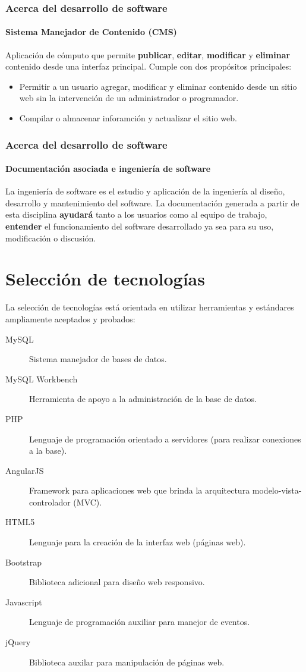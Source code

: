 \documentclass{beamer}
\begin{document}
\begin{frame}
	\frametitle{Acerca del desarrollo de software}
	\framesubtitle{Sistema Manejador de Contenido (CMS)}
	Aplicación de cómputo que permite \textbf{publicar}, \textbf{editar}, \textbf{modificar} y \textbf{eliminar} contenido desde una interfaz principal. Cumple con dos propósitos principales:
	\begin{itemize}
		\item Permitir a un usuario agregar, modificar y eliminar contenido desde un sitio web sin la intervención de un administrador o programador.
		\item Compilar o almacenar inforamción y actualizar el sitio web.
	\end{itemize}
\end{frame}

\begin{frame}
	\frametitle{Acerca del desarrollo de software}
	\framesubtitle{Documentación asociada e ingeniería de software}
	La ingeniería de software es el estudio y aplicación de la ingeniería al diseño, desarrollo y mantenimiento del software. La documentación generada a partir de esta disciplina \textbf{ayudará} tanto a los usuarios como al equipo de trabajo, \textbf{entender} el funcionamiento del software desarrollado ya sea para su uso, modificación o discusión.
\end{frame}

\section{Selección de tecnologías}
\begin{frame}
	La selección de tecnologías está orientada en utilizar herramientas y estándares ampliamente aceptados y probados:
	\begin{description}
		\item[MySQL] Sistema manejador de bases de datos.
		\item[MySQL Workbench] Herramienta de apoyo a la administración de la base de datos.
		\item[PHP] Lenguaje de programación orientado a servidores (para realizar conexiones a la base).
		\item[AngularJS] Framework para aplicaciones web que brinda la arquitectura modelo-vista-controlador (MVC).
		\item[HTML5] Lenguaje para la creación de la interfaz web (páginas web).
		\item[Bootstrap] Biblioteca adicional para diseño web responsivo.
		\item[Javascript] Lenguaje de programación auxiliar para manejor de eventos.
		\item[jQuery] Biblioteca auxilar para manipulación de páginas web.
	\end{description}
\end{frame}
\end{document}
